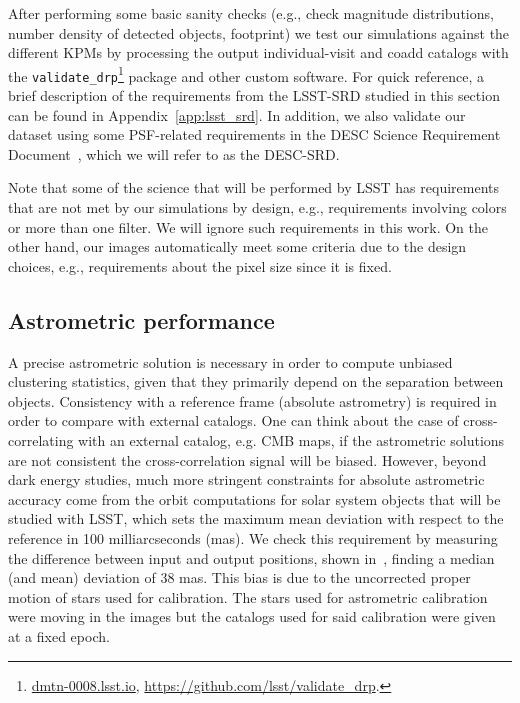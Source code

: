 \documentclass[a4paper,fleqn,usenatbib]{mnras}
\begin{document}
After performing some basic sanity checks (e.g., check magnitude distributions, number density of detected objects, footprint) we test our simulations against the different KPMs by processing the output individual-visit and coadd catalogs with the \texttt{validate\_drp}\footnote{\url{dmtn-0008.lsst.io}, \url{https://github.com/lsst/validate_drp}.} package and other custom software. For quick reference, a brief description of the requirements from the LSST-SRD studied in this section can be found in Appendix~\ref{app:lsst_srd}. In addition, we also validate our dataset using some PSF-related requirements in the DESC Science Requirement Document~\citep{2018arXiv180901669T}, which we will refer to as the DESC-SRD.
 
Note that some of the science that will be performed by LSST has requirements that are not met by our simulations by design, e.g., requirements involving colors or more than one filter. We will ignore such requirements in this work. On the other hand, our images automatically meet some criteria due to the design choices, e.g., requirements about the pixel size since it is fixed. 

\subsection{Astrometric performance}
\label{sssec:astrometry}

A precise astrometric solution is necessary in order to compute unbiased clustering statistics, given that they primarily depend on the separation between objects. Consistency with a reference frame (absolute astrometry) is required in order to compare with external catalogs. One can think about the case of cross-correlating with an external catalog, e.g. CMB maps, if the astrometric solutions are not consistent the cross-correlation signal will be biased. However, beyond dark energy studies, much more stringent constraints for absolute astrometric accuracy come from the orbit computations for solar system objects that will be studied with LSST, which sets the maximum mean deviation with respect to the reference in 100 milliarcseconds (mas). We check this requirement by measuring the difference between input and output positions, shown in~, finding a median (and mean) deviation of 38 mas. This bias is due to the uncorrected proper motion of stars used for calibration. The stars used for astrometric calibration were moving in the images but the catalogs used for said calibration were given at a fixed epoch.
\end{document}
